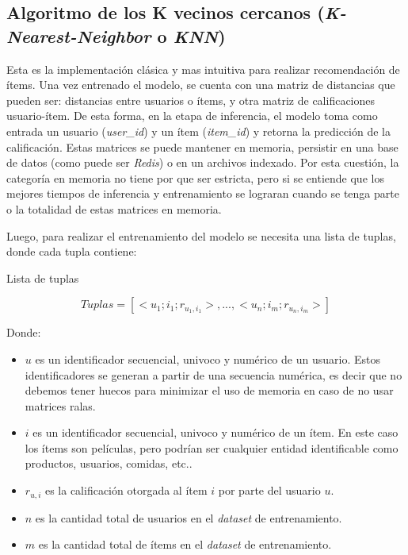 \documentclass[11pt,a4paper,twoside]{thesis}
\begin{document}
\subsection{
	Algoritmo de los K vecinos cercanos (\textit{K-Nearest-Neighbor}
	o \textit{KNN}) }

Esta es la implementación clásica y mas intuitiva para realizar recomendación
de ítems. Una vez entrenado el modelo, se cuenta con una matriz de distancias
que pueden ser: distancias entre usuarios o ítems, y otra matriz de
calificaciones usuario-ítem. De esta forma, en la etapa de inferencia, el
modelo toma como entrada un usuario (\textit{user\_id}) y un ítem
(\textit{item\_id}) y retorna la predicción de la calificación. Estas matrices
se puede mantener en memoria, persistir en una base de datos (como puede ser
\textit{Redis}) o en un archivos indexado. Por esta cuestión, la categoría en
memoria no tiene por que ser estricta, pero si se entiende que los mejores
tiempos de inferencia y entrenamiento se lograran cuando se tenga parte o la
totalidad de estas matrices en memoria.

\clearpage

Luego, para realizar el entrenamiento del modelo se necesita una lista de
tuplas, donde cada tupla contiene:

\begin{description}
	\item[Lista de tuplas]
\end{description}
\begin{equation}
	Tuplas = [<u_1; i_1; r_{u_1, i_1}>,...,<u_n; i_m; r_{u_n, i_m}>]
\end{equation}
\begin{description}
	\item[Donde:]
\end{description}
\begin{itemize}
	\item $u$ es un identificador secuencial, univoco y numérico de un usuario. Estos identificadores se generan a partir de una secuencia numérica, es decir que no debemos tener huecos para minimizar el uso de memoria en caso de no usar matrices ralas.
	\item $i$ es un identificador secuencial, univoco y numérico de un ítem. En este caso los ítems son películas, pero podrían ser cualquier entidad identificable como productos, usuarios, comidas, etc..
	\item $r_{u, i}$ es la calificación otorgada al ítem $i$ por parte del usuario $u$.
	\item $n$ es la cantidad total de usuarios en el \textit{dataset} de entrenamiento.
	\item $m$ es la cantidad total de ítems en el \textit{dataset} de entrenamiento.
\end{itemize}
\end{document}
